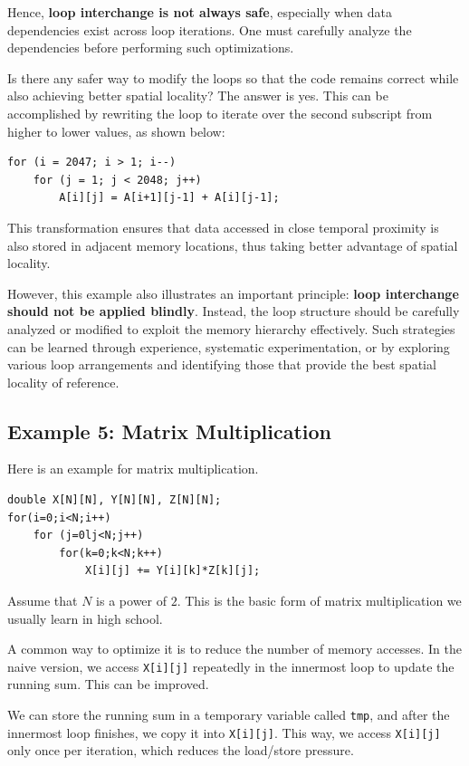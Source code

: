 \documentclass[12pt]{book}
\begin{document}
Hence, \textbf{loop interchange is not always safe}, especially when data dependencies exist across loop iterations. One must carefully analyze the dependencies before performing such optimizations.

Is there any safer way to modify the loops so that the code remains correct while also achieving better spatial locality? The answer is yes. This can be accomplished by rewriting the loop to iterate over the second subscript from higher to lower values, as shown below:

\begin{lstlisting}
for (i = 2047; i > 1; i--)
    for (j = 1; j < 2048; j++)
        A[i][j] = A[i+1][j-1] + A[i][j-1];
\end{lstlisting}

This transformation ensures that data accessed in close temporal proximity is also stored in adjacent memory locations, thus taking better advantage of spatial locality.

However, this example also illustrates an important principle: \textbf{loop interchange should not be applied blindly}. Instead, the loop structure should be carefully analyzed or modified to exploit the memory hierarchy effectively. Such strategies can be learned through experience, systematic experimentation, or by exploring various loop arrangements and identifying those that provide the best spatial locality of reference.

\subsection{Example 5: Matrix Multiplication}
Here is an example for matrix multiplication.
\begin{lstlisting}
double X[N][N], Y[N][N], Z[N][N];
for(i=0;i<N;i++)
    for (j=0lj<N;j++)
        for(k=0;k<N;k++)
            X[i][j] += Y[i][k]*Z[k][j];
\end{lstlisting}
Assume that $N$ is a power of $2$. This is the basic form of matrix multiplication we usually learn in high school.

A common way to optimize it is to reduce the number of memory accesses. In the naive version, we access \texttt{X[i][j]} repeatedly in the innermost loop to update the running sum. This can be improved.

We can store the running sum in a temporary variable called \texttt{tmp}, and after the innermost loop finishes, we copy it into \texttt{X[i][j]}. This way, we access \texttt{X[i][j]} only once per iteration, which reduces the load/store pressure.
\end{document}
